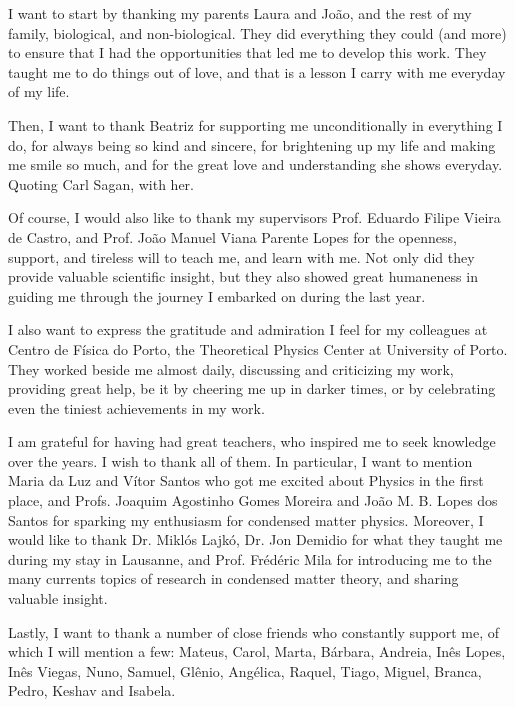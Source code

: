 
\begin{acknowledgments} 

I want to start by thanking my parents Laura and João, and the rest of my family, biological, and non-biological.
They did everything they could (and more) to ensure that I had the opportunities that led me to develop this work.
They taught me to do things out of love, and that is a lesson I carry with me everyday of my life.

Then, I want to thank Beatriz for supporting me unconditionally in everything I do, for always being  so kind and sincere, for brightening up my life and making me smile so much, and for the great love and understanding she shows everyday.
Quoting Carl Sagan,  with her.

Of course, I would also like to thank my supervisors Prof. Eduardo Filipe Vieira de Castro, and Prof. João Manuel Viana Parente Lopes for the openness, support, and tireless will to teach me, and learn with me.
Not only did they provide valuable scientific insight, but they also showed great humaneness in guiding me through the journey I embarked on during the last year.

I also want to express the gratitude and admiration I feel for my colleagues at Centro de Física do Porto, the Theoretical Physics Center at University of Porto.
They worked beside me almost daily, discussing and criticizing my work, providing great help, be it by cheering me up in darker times, or by celebrating even the tiniest achievements in my work.

I am grateful for having had great teachers, who inspired me to seek knowledge over the years. I wish to thank all of them. In particular, I want to mention Maria da Luz and Vítor Santos who got me excited about Physics in the first place, and Profs. Joaquim Agostinho Gomes Moreira and João M. B. Lopes dos Santos for sparking my enthusiasm for condensed matter physics. Moreover, I would like to thank Dr. Miklós Lajkó, Dr. Jon Demidio for what they taught me during my stay in Lausanne, and Prof. Frédéric Mila for introducing me to the many currents topics of research in condensed matter theory, and sharing valuable insight.

Lastly, I want to thank a number of close friends who constantly support me, of which I will mention a few: Mateus, Carol, Marta, Bárbara, Andreia, Inês Lopes, Inês Viegas, Nuno, Samuel, Glênio, Angélica, Raquel, Tiago, Miguel, Branca, Pedro, Keshav and Isabela. 

\end{acknowledgments}
\clearpage
\thispagestyle{empty}
\cleardoublepage